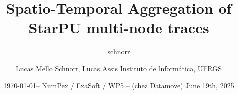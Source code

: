\documentclass[12pt,xcolor=dvipsnames,presentation,aspectratio=169]{beamer}
\author{schnorr}
\date{\today}
\title{Spatio-Temporal Aggregation of StarPU multi-node traces}
\begin{document}
\let\alert=\structure
\let\epsilon=\varepsilon
\let\leq=\leqslant
\let\geq=\geqslant

{%

\author{Lucas Mello Schnorr, Lucas Assis \newline Instituto de Informática, UFRGS}

\date{-- NumPex / ExaSoft / WP5 -- \newline (chez Datamove)  \newline June 19th, 2025 \\\smallskip}


}
\end{document}
